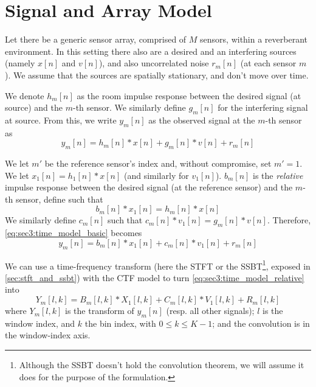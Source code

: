 \section{Signal and Array Model}
\label{sec:signal_model}

Let there be a generic sensor array, comprised of $M$ sensors, within a reverberant environment. In this setting there also are a desired and an interfering sources (namely $x[n]$ and $v[n]$), and also uncorrelated noise $r_m[n]$ (at each sensor $m$). We assume that the sources are spatially stationary, and don't move over time.

We denote $h_m[n]$ as the room impulse response between the desired signal (at source) and the $m$-th sensor. We similarly define $g_m[n]$ for the interfering signal at source. From this, we write $y_m[n]$ as the observed signal at the $m$-th sensor as
\begin{equation}
	\label{eq:sec3:time_model_basic}
	y_m[n] = h_m[n] \ast x[n] + g_m[n] \ast v[n] + r_m[n]
\end{equation}

We let $m'$ be the reference sensor's index and, without compromise, set $m'=1$. We let $x_1[n] = h_1[n] \ast x[n]$ (and similarly for $v_1[n]$). $b_m[n]$ is the \textit{relative} impulse response between the desired signal (at the reference sensor) and the $m$-th sensor, define such that
\begin{equation}
	b_m[n] \ast x_1[n] = h_m[n] \ast x[n]
\end{equation}
We similarly define $c_m[n]$ such that $c_m[n] \ast v_1[n] = g_m[n] \ast v[n]$. Therefore, \cref{eq:sec3:time_model_basic} becomes
\begin{equation}
	\label{eq:sec3:time_model_relative}
	y_m[n] = b_m[n] \ast x_1[n] + c_m[n] \ast v_1[n] + r_m[n]
\end{equation}

We can use a time-frequency transform (here the STFT or the SSBT\footnote{Although the SSBT doesn't hold the convolution theorem, we will assume it does for the purpose of the formulation.}, exposed in \cref{sec:stft_and_ssbt}) with the CTF model \cite{talmon_relative_2009} to turn \cref{eq:sec3:time_model_relative} into
\begin{equation}
	\label{eq:sec3:time-freq_model_conv}
	Y_m[l,k] = B_m[l,k] \ast X_1[l,k] + C_m[l,k] \ast V_1[l,k] + R_m[l,k]
\end{equation}
where $Y_m[l,k]$ is the transform of $y_m[n]$ (resp. all other signals); $l$ is the window index, and $k$ the bin index, with $0 \leq k \leq K-1$; and the convolution is in the window-index axis.

